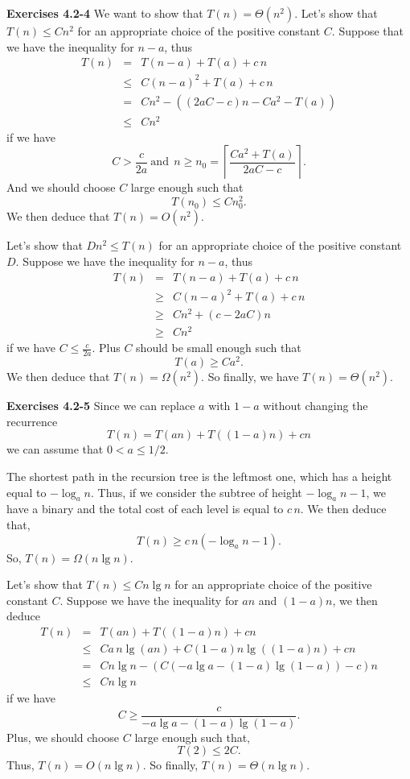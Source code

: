 \documentclass[a4paper,12pt]{article}
\newcommand{\newpar}[1]
{\bigskip \noindent \textbf{Exercises #1} \newline}
\begin{document}
\newpar{4.2-4} We want to show that $T(n) = \Theta(n^2)$.  Let's show
that $T(n) \le Cn^2$ for an appropriate choice of the positive
constant $C$.  Suppose that we have the inequality for $n-a$,
thus
\begin{eqnarray*}
T(n) &=& T(n-a) + T(a) + c\,n \\
&\le& C(n-a)^2 + T(a) + c\,n \\
&=& Cn^2 - ((2aC - c)n - Ca^2 - T(a)) \\
&\le& Cn^2
\end{eqnarray*}
if we have 
\[C > \frac{c}{2a}\ \mbox{and}\ \
n \ge n_0 = \left\lceil
\frac{Ca^2+T(a)}{2aC - c}\right\rceil.\]
And we should choose $C$ large enough such that
\[ T(n_0) \le Cn_0^2.\]
We then deduce that $T(n) = O(n^2)$.

\medskip
Let's show that $Dn^2 \le T(n)$ for an appropriate choice of the
positive constant $D$.  Suppose we have the inequality for $n-a$, thus
\begin{eqnarray*}
T(n) &=& T(n-a) + T(a) + c\,n \\
&\ge& C(n-a)^2 + T(a) + c\,n \\
&\ge& Cn^2 + (c-2aC)n \\
&\ge& Cn^2
\end{eqnarray*}
if we have $C \le \frac{c}{2a}$.  Plus $C$ should be small enough such
that
\[ T(a) \ge Ca^2.\]
We then deduce that $T(n) = \Omega(n^2)$.  So finally, we have $T(n) =
\Theta(n^2)$.

\newpar{4.2-5}
Since we can replace $a$ with $1-a$ without changing the recurrence 
\[ T(n) = T(an) + T((1-a)n) + cn\]
we can assume that $0 < a \le 1/2$.

The shortest path in the recursion tree is the leftmost one, which has a
height equal to $-\log_an$.  Thus, if we consider the subtree of
height $-\log_an - 1$, we have a binary and the total cost of each level
is equal to $c\,n$.  We then deduce that,
\[ T(n) \ge c\,n (- \log_a n - 1).\]
So, $T(n) = \Omega(n\lg n)$.

\medskip
Let's show that $T(n) \le C n\lg n$ for an appropriate choice of the
positive constant $C$.  Suppose we have the inequality for $an$ and
$(1-a)n$, we then deduce
\begin{eqnarray*}
T(n) &=& T(an) + T((1-a)n) + cn \\
&\le& Ca\,n\lg(an) + C(1-a)n\lg((1-a)n) + cn \\
&=& Cn\lg n - (C(-a \lg a -(1-a)\lg(1-a)) - c) n \\
&\le& Cn\lg n
\end{eqnarray*}
if we have
\[ C \ge \frac{c}{-a\lg a - (1-a)\lg(1-a)}.\]
Plus, we should choose $C$ large enough such that,
\[ T(2) \le 2C.\]
Thus, $T(n) = O(n\lg n)$.  So finally, $T(n) = \Theta(n\lg n)$.
\end{document}
